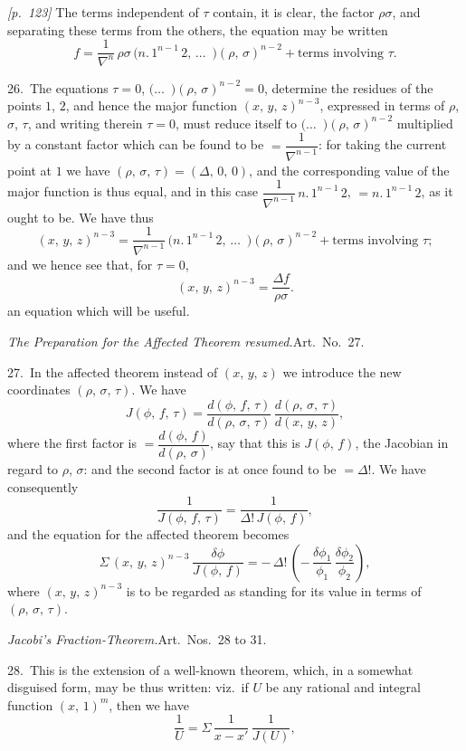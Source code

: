 \documentclass[11pt,a4paper]{article}
\theoremstyle{plain}
\theoremstyle{definition}
\theoremstyle{remark}
\begin{document}
\noindent\textit{[p.~123]} The terms independent of $\tau$ contain, it is clear, the factor $\rho\sigma$, and separating these terms from the others, the equation may be written
\[
f = \frac{1}{\nabla^n}\,\rho\sigma\,(n.\,1^{n-1}\,2,\,\ldots\!{\,\,\,)}(\rho,\,\sigma)^{n-2} + \text{terms involving }\tau.
\]

26.\ The equations $\tau = 0$, $(\ldots\!{\,\,\,)}(\rho,\,\sigma)^{n-2} = 0$, determine the residues of the points $1$, $2$, and hence the major function $(x,\,y,\,z)^{n-3}$, expressed in terms of $\rho$, $\sigma$, $\tau$, and writing therein $\tau = 0$, must reduce itself to $(\ldots\!{\,\,\,)}(\rho,\,\sigma)^{n-2}$ multiplied by a constant factor which can be found to be $= \dfrac{1}{\nabla^{n-1}}$: for taking the current point at $1$ we have $(\rho,\,\sigma,\,\tau) = (\Delta,\,0,\,0)$, and the corresponding value of the major function is thus equal, and in this case $\dfrac{1}{\nabla^{n-1}}\,n.\,1^{n-1}\,2$, $= n.\,1^{n-1}\,2$, as it ought to be. We have thus
\[
(x,\,y,\,z)^{n-3} = \frac{1}{\nabla^{n-1}}\,(n.\,1^{n-1}\,2,\,\ldots\!{\,\,\,)}(\rho,\,\sigma)^{n-2} + \text{terms involving }\tau;
\]
and we hence see that, for $\tau = 0$,
\[
(x,\,y,\,z)^{n-3} = \frac{\Delta f}{\rho\sigma}.
\]
an equation which will be useful.

\textit{The Preparation for the Affected Theorem resumed.}\quad Art.\ No.~27.

27.\ In the affected theorem instead of $(x,\,y,\,z)$ we introduce the new coordinates $(\rho,\,\sigma,\,\tau)$. We have
\[
J(\phi,\,f,\,\tau) = \frac{d(\phi,\,f,\,\tau)}{d(\rho,\,\sigma,\,\tau)}\,\frac{d(\rho,\,\sigma,\,\tau)}{d(x,\,y,\,z)},
\]
where the first factor is $= \dfrac{d(\phi,\,f)}{d(\rho,\,\sigma)}$, say that this is $J(\phi,\,f)$, the Jacobian in regard to $\rho$, $\sigma$: and the second factor is at once found to be $= \Delta!$. We have consequently
\[
\frac{1}{J(\phi,\,f,\,\tau)} = \frac{1}{\Delta!\,J(\phi,\,f)},
\]
and the equation for the affected theorem becomes
\[
\Sigma\,(x,\,y,\,z)^{n-3}\,\frac{\delta\phi}{J(\phi,\,f)} = -\,\Delta!\,\left(-\,\frac{\delta\phi_1}{\phi_1}\,\frac{\delta\phi_2}{\phi_2}\right),
\]
where $(x,\,y,\,z)^{n-3}$ is to be regarded as standing for its value in terms of $(\rho,\,\sigma,\,\tau)$.

\textit{Jacobi's Fraction-Theorem.}\quad Art.\ Nos.~28 to 31.

28.\ This is the extension of a well-known theorem, which, in a somewhat disguised form, may be thus written: viz.\ if $U$ be any rational and integral function $(x,\,1)^m$, then we have
\[
\frac{1}{U} = \Sigma\,\frac{1}{x - x'}\,\frac{1}{J(U)},
\]
\end{document}
